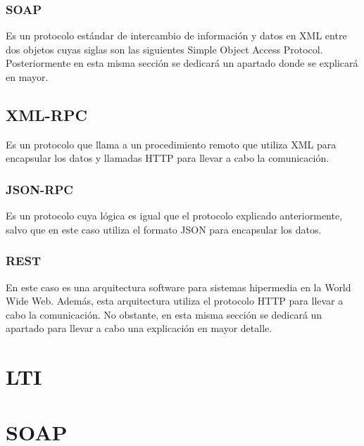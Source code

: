 \subsubsection{SOAP}

Es un protocolo estándar de intercambio de información y datos en XML entre dos objetos cuyas siglas son las siguientes Simple Object Access Protocol. Posteriormente en esta misma sección se dedicará un apartado donde se explicará en mayor.

\subsection{XML-RPC}

Es un protocolo que llama a un procedimiento remoto que utiliza XML para encapsular los datos y llamadas HTTP para llevar a cabo la comunicación.

\subsubsection{JSON-RPC}

Es un protocolo cuya lógica es igual que el protocolo explicado anteriormente, salvo que en este caso utiliza el formato JSON para encapsular los datos.

\subsubsection{REST}

En este caso es una arquitectura software para sistemas hipermedia en la World Wide Web. Además, esta arquitectura utiliza el protocolo HTTP para llevar a cabo la comunicación. No obstante, en esta misma sección se dedicará un apartado para llevar a cabo una explicación en mayor detalle. \cite{wiki:rest}


\section{LTI}

\section{SOAP}

